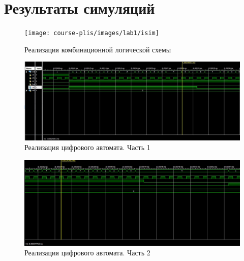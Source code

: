 \fontsize{14}{16pt}\selectfont
\chapter{Результаты симуляций}
\label{cha:appendix2}

\begin{figure}[h!]
	\centering
	\texttt{[image: course-plis/images/lab1/isim]}
	\caption{Реализация комбинационной логической схемы}
	\label{fig:1isim}
\end{figure}



\begin{figure}[h!]
	\centering
	\includegraphics[width=\linewidth]{course-plis/images/lab2/test-result2.1}
	\caption{Реализация цифрового автомата. Часть 1}
	\label{fig:2isim1}
\end{figure}

\begin{figure}[h!]
	\centering
	\includegraphics[width=\linewidth]{course-plis/images/lab2/test-result2.3}
	\caption{Реализация цифрового автомата. Часть 2}
	\label{fig:2isim2}
\end{figure}





